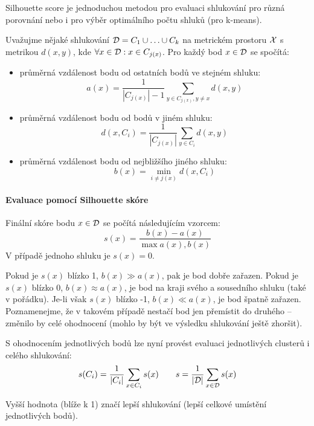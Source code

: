 Silhouette score je jednoduchou metodou pro evaluaci shlukování pro různá porovnání nebo i pro výběr optimálního počtu shluků (pro k-means).

Uvažujme nějaké shlukování $\mathcal{D} = C_1 \cup \ldots \cup C_k$ na metrickém prostoru $\mathcal{X}$ s metrikou $d(x, y)$, kde $\forall x \in \mathcal{D}: x \in C_{j(x)}$. Pro každý bod $x \in \mathcal{D}$ se spočítá:

\begin{itemize}

    \item průměrná vzdálenost bodu od ostatních bodů ve stejném shluku:
    \[
        a(x) = \frac{1}{|C_{j(x)}| - 1} \sum_{y \in C_{j(x)}, y \neq x} d(x, y)
    \]

    \item průměrná vzdálenost bodu od bodů v jiném shluku:
    \[
        d(x, C_i) = \frac{1}{|C_{j(x)}|} \sum_{y \in C_i} d(x, y)
    \]

    \item průměrná vzdálenost bodu od nejbližšího jiného shluku:
    \[
        b(x) = \min_{i \neq j(x)} d(x, C_i)
    \]

\end{itemize}

\paragraph{Evaluace pomocí Silhouette skóre}

Finální skóre bodu $x \in \mathcal{D}$ se počítá následujícím vzorcem:
\[
    s(x) = \frac{b(x) - a(x)}{\max {a(x), b(x)}}
\]
V případě jednoho shluku je $s(x) = 0$.

Pokud je $s(x)$ blízko 1, $b(x) \gg a(x)$, pak je bod dobře zařazen. Pokud je $s(x)$ blízko 0, $b(x) \approx a(x)$, je bod na kraji svého a sousedního shluku (také v pořádku). Je-li však $s(x)$ blízko -1, $b(x) \ll a(x)$, je bod špatně zařazen. Poznamenejme, že v takovém případě nestačí bod jen přemístit do druhého -- změnilo by celé ohodnocení (mohlo by být ve výsledku shlukování ještě zhoršit).

S ohodnocením jednotlivých bodů lze nyní provést evaluaci jednotlivých clusterů i celého shlukování:
\[
    s(C_i) = \frac{1}{|C_i|} \sum_{x \in C_i} s(x)
    \qquad
    s = \frac{1}{|\mathcal{D}|} \sum_{x \in \mathcal{D}} s(x)
\]

Vyšší hodnota (blíže k 1) značí lepší shlukování (lepší celkové umístění jednotlivých bodů).
